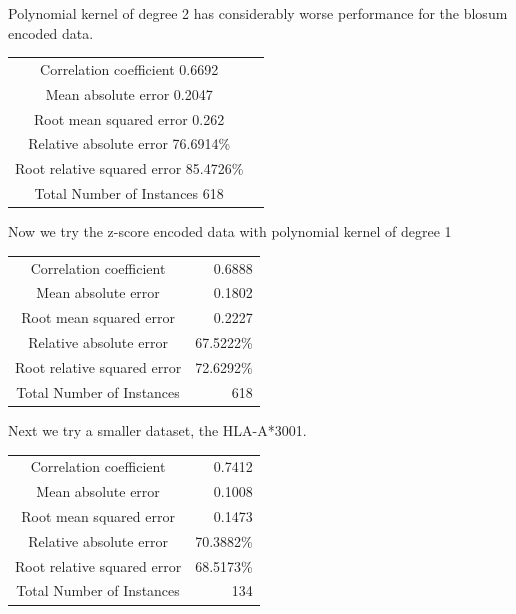 Polynomial kernel of degree 2 has considerably worse performance for the blosum encoded data.

\begin{table}[ht]
\begin{center}
\begin{tabular}{ c r }	
Correlation coefficient                  0.6692 \\
Mean absolute error                      0.2047 \\
Root mean squared error                  0.262 \\
Relative absolute error                 76.6914\% \\
Root relative squared error             85.4726\% \\
Total Number of Instances              618  \\
\end{tabular}
\end{center}
\end{table}

Now we try the z-score encoded data with polynomial kernel of degree 1

\begin{table}[ht]
\begin{center}
\begin{tabular}{ c r }
Correlation coefficient   &              0.6888 \\
Mean absolute error        &              0.1802 \\
Root mean squared error    &              0.2227 \\
Relative absolute error    &             67.5222\% \\
Root relative squared error &             72.6292\% \\
Total Number of Instances   &           618     \\
\end{tabular}
\end{center}
\end{table}

Next we try a smaller dataset, the HLA-A*3001.

\begin{table}[ht]
\begin{center}
\begin{tabular}{ c r }
Correlation coefficient       &           0.7412 \\
Mean absolute error            &          0.1008 \\
Root mean squared error        &          0.1473 \\
Relative absolute error        &         70.3882\% \\
Root relative squared error    &         68.5173\% \\
Total Number of Instances      &        134 \\
\end{tabular}
\end{center}
\end{table}

